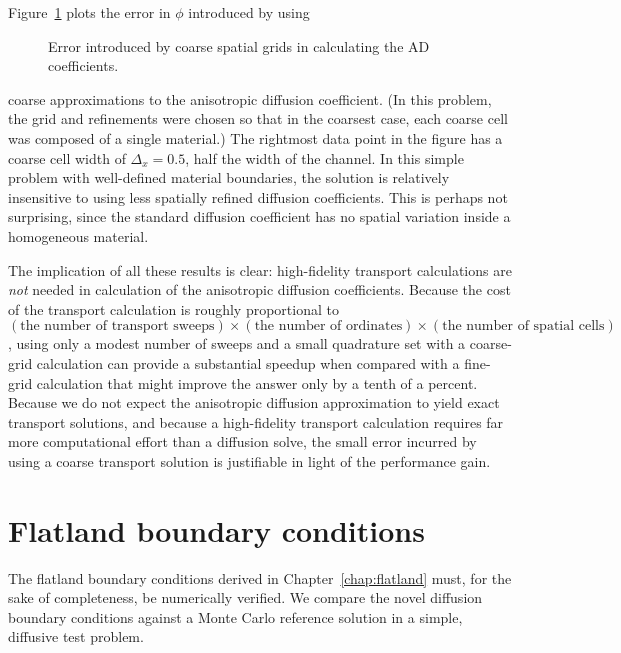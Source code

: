 Figure~\ref{fig:ssSingleMgConv} plots the error in $\phi$ introduced by using
%
\begin{figure}[htb]
  \centering
  
  \caption{Error introduced by coarse spatial grids in calculating the AD
  coefficients.}
  \label{fig:ssSingleMgConv}
\end{figure}
%
coarse approximations to the anisotropic diffusion coefficient. (In this
problem, the grid and refinements were chosen so that in the coarsest case, each
coarse cell was composed of a single material.) 
The rightmost data point in the figure has a coarse cell width of
$\Delta_x=0.5$, half the width of the channel.
In this simple problem with well-defined material boundaries, the
solution is relatively insensitive to using less spatially refined diffusion
coefficients. This is perhaps not surprising, since the standard
diffusion coefficient has no spatial variation inside a homogeneous material.

The implication of all these results is clear: high-fidelity transport
calculations are \emph{not} needed in calculation of the anisotropic diffusion
coefficients. Because the cost of the transport calculation is
roughly proportional to $
  (\text{the number of transport sweeps}) \times 
  (\text{the number of ordinates}) \times 
  (\text{the number of spatial cells})$,
using only a modest number of sweeps and a small quadrature set with a
coarse-grid calculation can provide a substantial speedup when compared with a
fine-grid calculation that might improve the answer only by a tenth of a
percent. Because we do not expect the anisotropic diffusion approximation to
yield exact transport solutions, and because a high-fidelity transport
calculation requires far more computational effort than a diffusion solve, the
small error incurred by using a coarse transport solution is justifiable in
light of the performance gain.

\section{Flatland boundary conditions}\label{sec:nrFlatlandBcs}

The flatland boundary conditions derived in Chapter~\ref{chap:flatland} must,
for the sake of completeness, be numerically verified. We compare the novel
diffusion boundary conditions against a Monte Carlo reference solution in a
simple, diffusive test problem.

